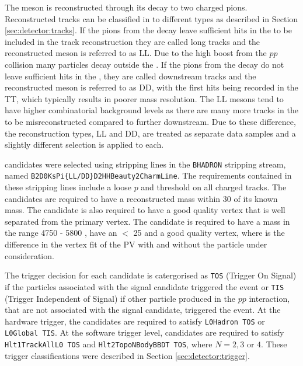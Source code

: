 The \KS meson is reconstructed through its decay to two charged pions. Reconstructed tracks can be classified in to different types as described in Section \ref{sec:detector:tracks}. If the pions from the \KS decay leave sufficient hits in the \velo to be included in the track reconstruction they are called long tracks and the reconstructed \KS meson is referred to as LL. Due to the high boost from the $pp$ collision many \KS particles decay outside the \velo. If the pions from the \KS decay do not leave sufficient hits in the \velo, they are called downstream tracks and the reconstructed \KS meson is referred to as DD, with the first hits being recorded in the TT, which typically results in poorer mass resolution. The LL \KS mesons tend to have higher combinatorial background levels as there are many more tracks in the \velo to be misreconstructed compared to further downstream. Due to these difference, the \KS reconstruction types, LL and DD, are treated as separate data samples and a slightly different selection is applied to each.

\decay{\Bpm}{\D\Kstarpm} candidates were selected using stripping lines in the {\tt BHADRON} stripping stream, named {\tt B2D0KsPi\{LL/DD\}D2HHBeauty2CharmLine}. The requirements contained in these stripping lines include a loose $p$ and \pt threshold on all charged tracks. The \KS candidates are required to have a reconstructed mass within 30 \mevcc of its known mass. The \KS candidate is also required to have a good quality vertex that is well separated from the primary vertex. The \Bm candidate is required to have a mass in the range 4750 - 5800 \mevcc, have an \chisqip $<$ 25 and a good quality vertex, where \chisqip is the difference in the vertex fit \chisq of the PV with and without the particle under consideration.

The trigger decision for each candidate is catergorised as {\tt TOS} (Trigger On Signal) if the particles associated with the signal candidate triggered the event or {\tt TIS} (Trigger Independent of Signal) if other particle produced in the $pp$ interaction, that are not associated with the signal candidate, triggered the event. At the hardware trigger, the \Bm candidates are required to satisfy {\tt L0Hadron TOS} or {\tt L0Global TIS}. At the software trigger level, \Bm candidates are required to satisfy {\tt Hlt1TrackAllL0 TOS} and {\tt Hlt2TopoNBodyBBDT TOS}, where $N = 2,3 \text{ or } 4$. These trigger classifications were described in Section \ref{sec:detector:trigger}.

